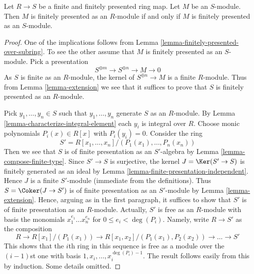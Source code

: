 \begin{lemma}
\label{lemma-finite-finitely-presented-extension}
Let $R \to S$ be a finite and finitely presented ring map.
Let $M$ be an $S$-module.
Then $M$ is finitely presented as an $R$-module if and only if
$M$ is finitely presented as an $S$-module.
\end{lemma}

\begin{proof}
One of the implications follows from
Lemma \ref{lemma-finitely-presented-over-subring}.
To see the other assume that $M$ is finitely presented as an $S$-module.
Pick a presentation
$$
S^{\oplus m} \longrightarrow
S^{\oplus n} \longrightarrow
M \longrightarrow 0
$$
As $S$ is finite as an $R$-module, the kernel of
$S^{\oplus n} \to M$ is a finite $R$-module. Thus from
Lemma \ref{lemma-extension}
we see that it suffices to prove that $S$ is finitely presented as an
$R$-module.

\medskip\noindent
Pick $y_1, \ldots, y_n \in S$ such that $y_1, \ldots, y_n$ generate $S$
as an $R$-module. By Lemma \ref{lemma-characterize-integral-element}
each $y_i$ is integral over $R$. Choose monic polynomials
$P_i(x) \in R[x]$ with $P_i(y_i) = 0$. Consider the ring
$$
S' = R[x_1, \ldots, x_n]/(P_1(x_1), \ldots, P_n(x_n))
$$
Then we see that $S$ is of finite presentation as an $S'$-algebra
by Lemma \ref{lemma-compose-finite-type}. Since $S' \to S$ is surjective,
the kernel $J = \Ker(S' \to S)$ is finitely generated as an ideal by
Lemma \ref{lemma-finite-presentation-independent}. Hence $J$ is a finite
$S'$-module (immediate from the definitions).
Thus $S = \Coker(J \to S')$ is  of finite presentation as an $S'$-module
by Lemma \ref{lemma-extension}.
Hence, arguing as in the first paragraph, it suffices to show that $S'$ is
of finite presentation as an $R$-module. Actually, $S'$ is free as an
$R$-module with basis the monomials $x_1^{e_1} \ldots x_n^{e_n}$
for $0 \leq e_i < \deg(P_i)$. Namely, write $R \to S'$ as the composition
$$
R \to R[x_1]/(P_1(x_1)) \to R[x_1, x_2]/(P_1(x_1), P_2(x_2)) \to
\ldots \to S'
$$
This shows that the $i$th ring in this sequence is free as a module over the
$(i - 1)$st one with basis $1, x_i, \ldots, x_i^{\deg(P_i) - 1}$. The result
follows easily from this by induction. Some details omitted.
\end{proof}
